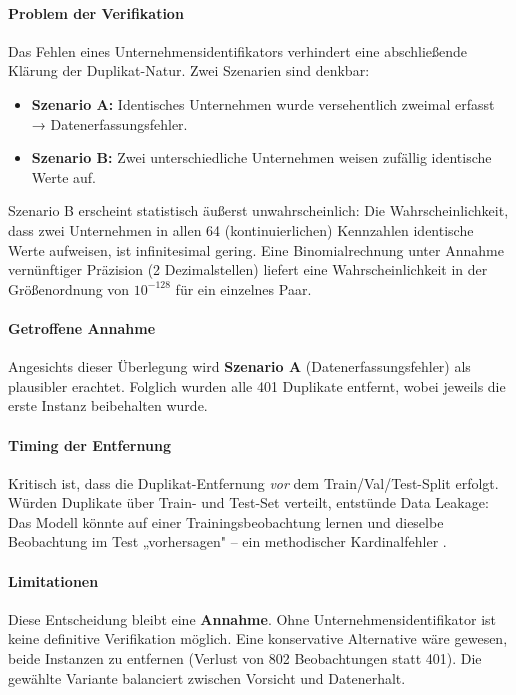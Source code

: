 \paragraph{Problem der Verifikation}
Das Fehlen eines Unternehmensidentifikators verhindert eine abschließende Klärung der Duplikat-Natur. Zwei Szenarien sind denkbar:

\begin{itemize}[topsep=0.2\baselineskip]
    \item \textbf{Szenario A:} Identisches Unternehmen wurde versehentlich zweimal erfasst → Datenerfassungsfehler.
    \item \textbf{Szenario B:} Zwei unterschiedliche Unternehmen weisen zufällig identische Werte auf.
\end{itemize}

Szenario B erscheint statistisch äußerst unwahrscheinlich: Die Wahrscheinlichkeit, dass zwei Unternehmen in allen 64 (kontinuierlichen) Kennzahlen identische Werte aufweisen, ist infinitesimal gering. Eine Binomialrechnung unter Annahme vernünftiger Präzision (2 Dezimalstellen) liefert eine Wahrscheinlichkeit in der Größenordnung von $10^{-128}$ für ein einzelnes Paar.

\paragraph{Getroffene Annahme}
Angesichts dieser Überlegung wird \textbf{Szenario A} (Datenerfassungsfehler) als plausibler erachtet. Folglich wurden alle 401 Duplikate entfernt, wobei jeweils die erste Instanz beibehalten wurde.

\paragraph{Timing der Entfernung}
Kritisch ist, dass die Duplikat-Entfernung \textit{vor} dem Train/Val/Test-Split erfolgt. Würden Duplikate über Train- und Test-Set verteilt, entstünde Data Leakage: Das Modell könnte auf einer Trainingsbeobachtung lernen und dieselbe Beobachtung im Test „vorhersagen" – ein methodischer Kardinalfehler \parencite{goodfellow2016deep}.

\paragraph{Limitationen}
Diese Entscheidung bleibt eine \textbf{Annahme}. Ohne Unternehmensidentifikator ist keine definitive Verifikation möglich. Eine konservative Alternative wäre gewesen, beide Instanzen zu entfernen (Verlust von 802 Beobachtungen statt 401). Die gewählte Variante balanciert zwischen Vorsicht und Datenerhalt.

